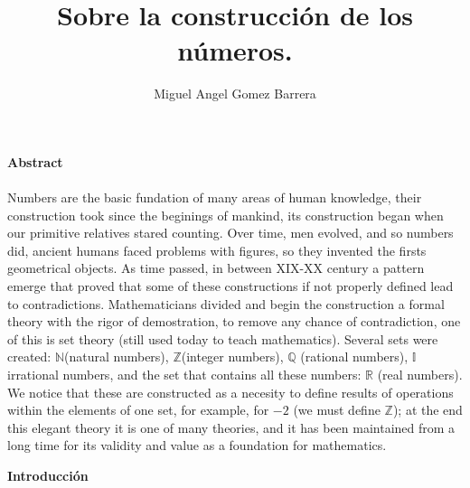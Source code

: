 \documentclass{article}
\title{Sobre la construcción de los números.}
\author{Miguel Angel Gomez Barrera}
\begin{document}
\maketitle

\begin{center}\textbf{Abstract}\end{center}
\paragraph{} Numbers are the basic fundation of many areas of human knowledge, their construction took since the beginings of mankind, its construction began when our primitive relatives stared counting. Over time, men evolved, and so numbers did, ancient humans faced problems with figures, so they invented the firsts geometrical objects. As time passed, in between XIX-XX century a pattern emerge that proved that some of these constructions if not properly defined lead to contradictions. Mathematicians divided and begin the construction a formal theory with the rigor of demostration, to remove any chance of contradiction, one of this is set theory (still used today to teach mathematics). Several sets were created: $\mathbb{N}$(natural numbers), $\mathbb{Z}$(integer numbers), $\mathbb{Q}$ (rational numbers), $\mathbb{I}$ irrational numbers, and the set that contains all these numbers: $\mathbb{R}$ (real numbers). We notice that these are constructed as a necesity to define results of operations within the elements of one set, for example, for $-2$ (we must define $\mathbb{Z}$); at the end this elegant theory it is one of many theories, and it has been maintained from a long time for its validity and value as a foundation for mathematics.

\begin{center}\textbf{Introducción}\end{center}
\end{document}
